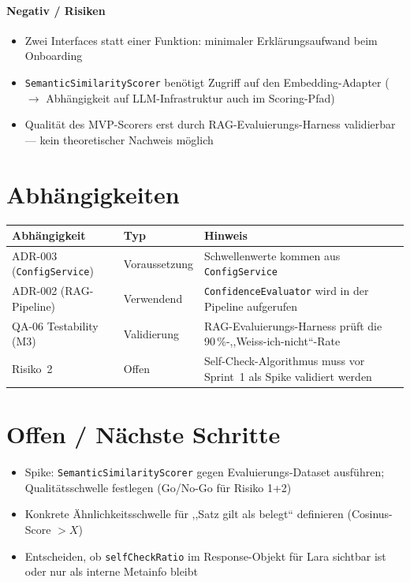\documentclass[a4paper, 11pt, oneside]{report}
\newcommand{\code}[1]{\texttt{\small #1}}
\newcommand{\ra}{$\rightarrow$\xspace}
\newcommand{\todo}{$\square$\;}
\begin{document}
\paragraph{Negativ / Risiken}
\begin{itemize}
  \item Zwei Interfaces statt einer Funktion: minimaler Erklärungsaufwand
        beim Onboarding
  \item \code{SemanticSimilarityScorer} benötigt Zugriff auf den
        Embedding-Adapter (\ra Abhängigkeit auf LLM-Infrastruktur auch
        im Scoring-Pfad)
  \item Qualität des MVP-Scorers erst durch RAG-Evaluierungs-Harness
        validierbar --- kein theoretischer Nachweis möglich
\end{itemize}

\section{Abhängigkeiten}

\begin{table}[htb]
\small\centering
\begin{tabularx}{\linewidth}{L{4cm} L{3cm} X}
\toprule
{}
\textbf{Abhängigkeit} & \textbf{Typ} & \textbf{Hinweis} \\
\midrule
ADR-003 (\code{ConfigService})  & Voraussetzung & Schwellenwerte kommen aus \code{ConfigService} \\
ADR-002 (RAG-Pipeline)          & Verwendend    & \code{ConfidenceEvaluator} wird in der Pipeline aufgerufen \\
QA-06 Testability (M3)          & Validierung   & RAG-Evaluierungs-Harness prüft die 90\,\%-,,Weiss-ich-nicht``-Rate \\
Risiko~2                        & Offen         & Self-Check-Algorithmus muss vor Sprint~1 als Spike validiert werden \\
\bottomrule
\end{tabularx}
\end{table}

\section{Offen / Nächste Schritte}

\begin{itemize}[label=\todo]
  \item Spike: \code{SemanticSimilarityScorer} gegen Evaluierungs-Dataset
        ausführen; Qualitätsschwelle festlegen (Go/No-Go für Risiko 1+2)
  \item Konkrete Ähnlichkeitsschwelle für ,,Satz gilt als belegt`` definieren
        (Cosinus-Score $> X$)
  \item Entscheiden, ob \code{selfCheckRatio} im Response-Objekt für Lara
        sichtbar ist oder nur als interne Metainfo bleibt
\end{itemize}
\end{document}
